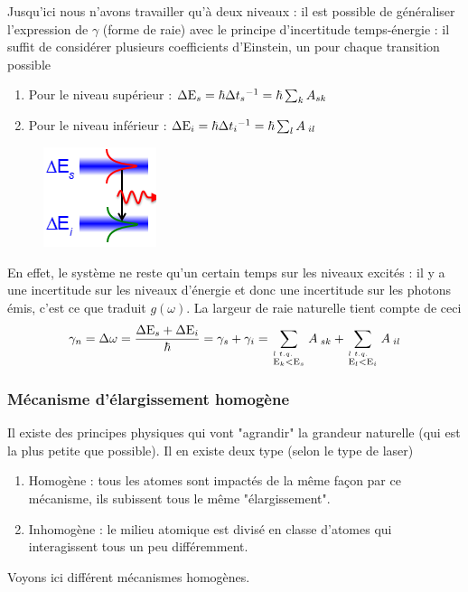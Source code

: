 	Jusqu'ici nous n'avons travailler qu'à deux niveaux : il est possible de généraliser l'expression 
	de $\gamma$ (forme de raie) avec le principe d'incertitude temps-énergie : il suffit de considérer 
	plusieurs coefficients d'Einstein, un pour chaque transition possible
	\begin{enumerate}
	\item Pour le niveau supérieur : $\Delta {{\rm{E}}_s} = \hbar \Delta {t_s}^{ - 1} = \hbar \sum
	\nolimits_k {{A_{sk}}} $
	\item Pour le niveau inférieur : $\Delta {{\rm{E}}_i} = \hbar \Delta {t_i}^{ - 1} = \hbar \sum\nolimits_l {{A_{\;il}}} $
	\end{enumerate}

	\begin{figure}
	\vspace{-5mm}
	\includegraphics[scale=0.85]{ch2/image18.png}
	\end{figure}
	En effet, le système ne reste qu'un certain temps sur les niveaux excités : il y a une incertitude
	 sur les niveaux d'énergie et donc une incertitude sur les photons émis, c'est ce que traduit
	 $g(\omega)$. La largeur de raie naturelle tient compte de ceci
	 \begin{equation}
	{\gamma _n} = \Delta \omega  = \frac{{\Delta {{\rm{E}}_s} + \Delta {{\rm{E}}_i}}}{\hbar } = {\gamma _s} + {\gamma _i} = \sum\limits_{l\,\,t.q.\hfill\atop
\scriptstyle{{\rm{E}}_k} < {{\rm{E}}_s}\hfill} {{A_{\;sk}}}  + \sum\limits_{l\,\,t.q.\hfill\atop
\scriptstyle{{\rm{E}}_l} < {{\rm{E}}_i}\hfill} {{A_{\;il}}} 
	 \end{equation}
	 
	 \subsubsection{Mécanisme d'élargissement homogène}
	 Il existe des principes physiques qui vont "agrandir" la grandeur naturelle (qui est la plus 
	 petite que possible). Il en existe deux type (selon le type de laser)
	 \begin{enumerate}
	 \item Homogène : tous les atomes sont impactés de la même façon par ce mécanisme, ils subissent 
	 tous le même "élargissement".
	 \item Inhomogène : le milieu atomique est divisé en classe d'atomes qui interagissent tous 
	 un peu différemment.
	 \end{enumerate}
	 Voyons ici différent mécanismes homogènes.\\
	 
